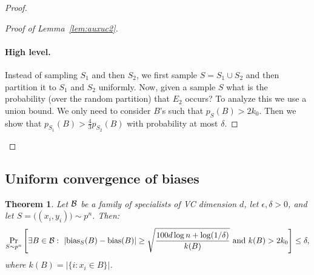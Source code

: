 \documentclass{article}
\newtheorem{theorem}{Theorem}[section]
\newcommand{\B}{{\cal B}}
\newcommand{\bias}{\text{bias}}
\newcommand{\samp}{S}
\newcommand{\eps}{\epsilon}
\begin{document}
\begin{proof}
\begin{proof}[Proof of Lemma~\ref{lem:auxuc2}]\ \\

\paragraph{High level.}
Instead of sampling $S_1$ and then $S_2$,
we first sample $S=S_1\cup S_2$ and 
then partition it to $S_1$ and $S_2$ uniformly.
Now, given a sample $S$ what is the probability (over the random partition)
that $E_2$ occurs?
To analyze this we use a union bound. 
We only need to consider $B$'s such that $p_S(B) > 2k_0$.
Then we show that $p_{S_1}(B) > \frac{4}{3}p_{S_2}(B)$
with probability at most $\delta$.

\end{proof}

  
  
%
%

  \end{proof}

\subsection{Uniform convergence of biases}
\begin{theorem}
Let $\B$ be a family of specialists of VC dimension $d$, 
let $\eps,\delta>0$,
and let $S=\bigl((x_i,y_i)\bigr) \sim p^n$.
Then:
\[\Pr_{\samp\sim p^n}\left[\exists {B\in\B}:~\lvert
  \bias_{\samp}(B) -  \bias(B)\rvert \geq \sqrt{\frac{100d\log n +
      \log(1/\delta)}{k(B)} }
  \mbox{ and } k(B)>2k_0
  \right] \leq \delta,
\]
where $k(B) = \lvert\{ i : x_i\in B \}\rvert$.
\end{theorem}
\end{document}
